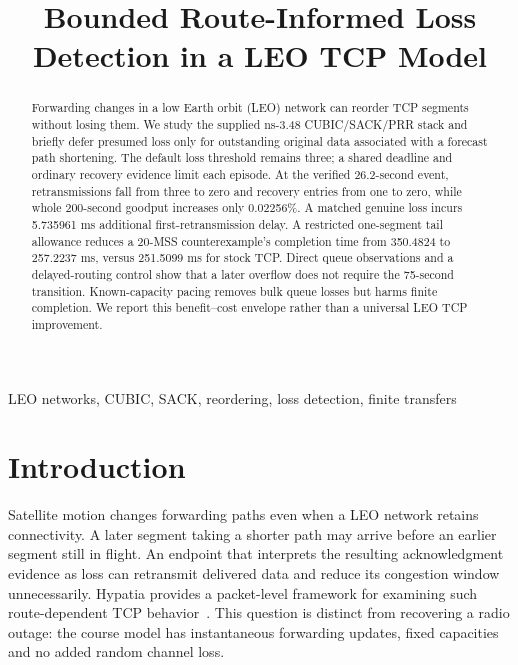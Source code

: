 \documentclass[conference]{IEEEtran}
\begin{document}
\title{Bounded Route-Informed Loss Detection in a LEO TCP Model}
\author{
}
\maketitle

\begin{abstract}
Forwarding changes in a low Earth orbit (LEO) network can reorder TCP
segments without losing them. We study the supplied ns-3.48
CUBIC/SACK/PRR stack and briefly defer presumed loss only for outstanding
original data associated with a forecast path shortening. The default
loss threshold remains three; a shared deadline and ordinary recovery
evidence limit each episode. At the verified 26.2-second event,
retransmissions fall from three to zero and recovery entries from one to
zero, while whole 200-second goodput increases only 0.02256\%.
A matched genuine loss incurs 5.735961 ms additional first-retransmission
delay. A restricted one-segment tail allowance reduces a 20-MSS
counterexample's completion time from 350.4824 to 257.2237 ms, versus
251.5099 ms for stock TCP. Direct queue observations and a delayed-routing
control show that a later overflow does not require the 75-second
transition. Known-capacity pacing removes bulk queue losses but harms
finite completion. We report this benefit--cost envelope rather than a
universal LEO TCP improvement.
\end{abstract}
\begin{IEEEkeywords}
LEO networks, CUBIC, SACK, reordering, loss detection, finite transfers
\end{IEEEkeywords}

\section{Introduction}
Satellite motion changes forwarding paths even when a LEO network
retains connectivity. A later segment taking a shorter path may arrive
before an earlier segment still in flight. An endpoint that interprets
the resulting acknowledgment evidence as loss can retransmit delivered
data and reduce its congestion window unnecessarily. Hypatia provides a
packet-level framework for examining such route-dependent TCP
behavior~\cite{hypatia}. This question is distinct from recovering a
radio outage: the course model has instantaneous forwarding updates,
fixed capacities and no added random channel loss.
\end{document}
